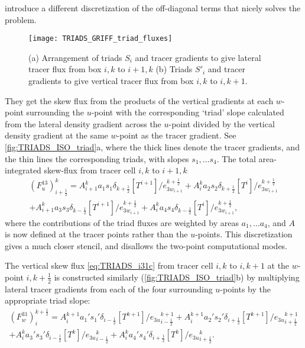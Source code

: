 \documentclass[../main/NEMO_manual]{subfiles}
\begin{document}
\citep{griffies.gnanadesikan.ea_JPO98} introduce a different discretization of the off-diagonal terms that
nicely solves the problem.
\begin{figure}[tb]
  \centering
  \texttt{[image: TRIADS\_GRIFF\_triad\_fluxes]}
  \caption[Triads arrangement and tracer gradients to give lateral and vertical tracer fluxes]{
    (a) Arrangement of triads $S_i$ and tracer gradients to
    give lateral tracer flux from box $i,k$ to $i+1,k$
    (b) Triads $S'_i$ and tracer gradients to give vertical tracer flux from
    box $i,k$ to $i,k+1$.}
  \label{fig:TRIADS_ISO_triad}
\end{figure}
They get the skew flux from the products of the vertical gradients at each $w$-point surrounding the $u$-point with
the corresponding `triad' slope calculated from the lateral density gradient across the $u$-point divided by
the vertical density gradient at the same $w$-point as the tracer gradient.
See \autoref{fig:TRIADS_ISO_triad}a, where the thick lines denote the tracer gradients,
and the thin lines the corresponding triads, with slopes $s_1, \dotsc s_4$.
The total area-integrated skew-flux from tracer cell $i,k$ to $i+1,k$
\begin{multline}
  \label{eq:TRIADS_i13}
  \left( F_u^{13}  \right)_{i+\frac{1}{2}}^k = {A}_{i+1}^k a_1 s_1
  \delta_{k+\frac{1}{2}} \left[ T^{i+1}
  \right]/e_{{3w}_{i+1}}^{k+\frac{1}{2}}  + {A} _i^k a_2 s_2 \delta
  _{k+\frac{1}{2}} \left[ T^i
  \right]/e_{{3w}_{i+1}}^{k+\frac{1}{2}} \\
  +{A} _{i+1}^k a_3 s_3 \delta_{k-\frac{1}{2}} \left[ T^{i+1}
  \right]/e_{{3w}_{i+1}}^{k+\frac{1}{2}}  +{A} _i^k a_4 s_4 \delta
  _{k-\frac{1}{2}} \left[ T^i \right]/e_{{3w}_{i+1}}^{k+\frac{1}{2}},
\end{multline}
where the contributions of the triad fluxes are weighted by areas $a_1, \dotsc a_4$,
and ${A}$ is now defined at the tracer points rather than the $u$-points.
This discretization gives a much closer stencil, and disallows the two-point computational modes.

The vertical skew flux \autoref{eq:TRIADS_i31c} from tracer cell $i,k$ to $i,k+1$ at
the $w$-point $i,k+\frac{1}{2}$ is constructed similarly (\autoref{fig:TRIADS_ISO_triad}b) by
multiplying lateral tracer gradients from each of the four surrounding $u$-points by the appropriate triad slope:
\begin{multline}
  \label{eq:TRIADS_i31}
  \left( F_w^{31} \right) _i ^{k+\frac{1}{2}} =  {A}_i^{k+1} a_{1}'
  s_{1}' \delta_{i-\frac{1}{2}} \left[ T^{k+1} \right]/{e_{3u}}_{i-\frac{1}{2}}^{k+1}
  +{A}_i^{k+1} a_{2}' s_{2}' \delta_{i+\frac{1}{2}} \left[ T^{k+1} \right]/{e_{3u}}_{i+\frac{1}{2}}^{k+1} \\
  + {A}_i^k a_{3}' s_{3}' \delta_{i-\frac{1}{2}} \left[ T^k\right]/{e_{3u}}_{i-\frac{1}{2}}^k
  +{A}_i^k a_{4}' s_{4}' \delta_{i+\frac{1}{2}} \left[ T^k \right]/{e_{3u}}_{i+\frac{1}{2}}^k.
\end{multline}
\end{document}
